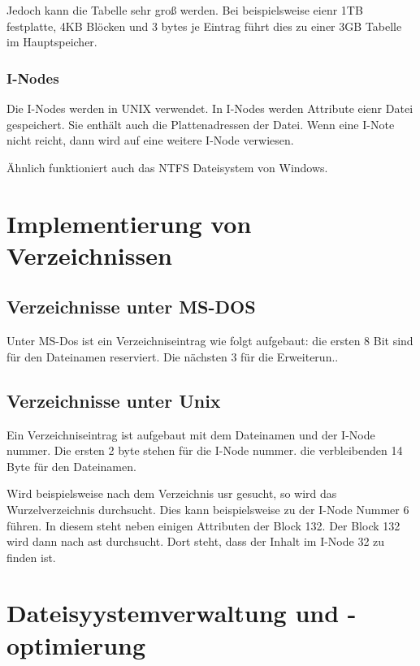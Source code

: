 Jedoch kann die Tabelle sehr groß werden. Bei beispielsweise eienr 1TB festplatte, 4KB Blöcken und 3 bytes je Eintrag führt dies zu einer 3GB Tabelle im Hauptspeicher.

\subsubsection{I-Nodes}

Die I-Nodes werden in UNIX verwendet. In I-Nodes werden Attribute eienr Datei gespeichert. Sie enthält auch die Plattenadressen der Datei. Wenn eine I-Note nicht reicht, dann wird auf eine weitere I-Node verwiesen. 

Ähnlich funktioniert auch das NTFS Dateisystem von Windows.

\section{Implementierung von Verzeichnissen}

\subsection{Verzeichnisse unter MS-DOS}

Unter MS-Dos ist ein Verzeichniseintrag wie folgt aufgebaut: die ersten 8 Bit sind für den Dateinamen reserviert. Die nächsten 3 für die Erweiterun..

\subsection{Verzeichnisse unter Unix}

Ein Verzeichniseintrag ist aufgebaut mit dem Dateinamen und der I-Node nummer. Die ersten 2 byte stehen für die I-Node nummer. die verbleibenden 14 Byte für den Dateinamen.

Wird beispielsweise nach dem Verzeichnis usr gesucht, so wird das Wurzelverzeichnis durchsucht. Dies kann beispielsweise zu der I-Node Nummer 6 führen. In diesem steht neben einigen Attributen der Block 132. Der Block 132 wird dann nach ast durchsucht. Dort steht, dass der Inhalt im I-Node 32 zu finden ist.

\section{Dateisyystemverwaltung und -optimierung}